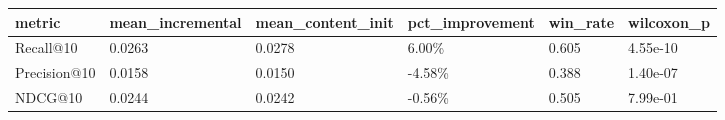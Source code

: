 \begin{tabular}{llllll}
\toprule
metric & mean_incremental & mean_content_init & pct_improvement & win_rate & wilcoxon_p \\
\midrule
Recall@10 & 0.0263 & 0.0278 & 6.00\% & 0.605 & 4.55e-10 \\
Precision@10 & 0.0158 & 0.0150 & -4.58\% & 0.388 & 1.40e-07 \\
NDCG@10 & 0.0244 & 0.0242 & -0.56\% & 0.505 & 7.99e-01 \\
\bottomrule
\end{tabular}
